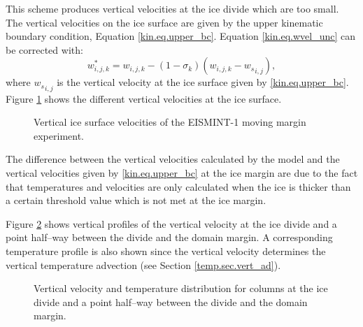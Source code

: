 This scheme produces vertical velocities at the ice divide which are too small. The vertical velocities on the ice surface are given by the upper kinematic boundary condition, Equation \eqref{kin.eq.upper_bc}. Equation \eqref{kin.eq.wvel_unc} can be corrected with:
\begin{equation}
  \label{kin.eq.wvel_cor}
   w^\ast_{i,j,k}=w_{i,j,k}-(1-\sigma_k)(w_{i,j,k}-{w_s}_{i,j}),
\end{equation}
where ${w_s}_{i,j}$ is the vertical velocity at the ice surface given by \eqref{kin.eq.upper_bc}. Figure \ref{kin.fig.w_profile} shows the different vertical velocities at the ice surface.
\begin{figure}[htbp]
  \centering
  
  \caption{Vertical ice surface velocities of the EISMINT-1 moving margin experiment.}
  \label{kin.fig.w_profile}
\end{figure}
The difference between the vertical velocities calculated by the model and the vertical velocities given by \eqref{kin.eq.upper_bc} at the ice margin are due to the fact that temperatures and velocities are only calculated when the ice is thicker than a certain threshold value which is not met at the ice margin.

Figure \ref{kin.fig.wt_sigma} shows vertical profiles of the vertical velocity at the ice divide and a point half--way between the divide and the domain margin. A corresponding temperature profile is also shown since the vertical velocity determines the vertical temperature advection (see Section \ref{temp.sec.vert_ad}).
\begin{figure}[htbp]
  \centering
  
  \caption{Vertical velocity and temperature distribution for columns at the ice divide and a point half--way between the divide and the domain margin.}
  \label{kin.fig.wt_sigma}
\end{figure}